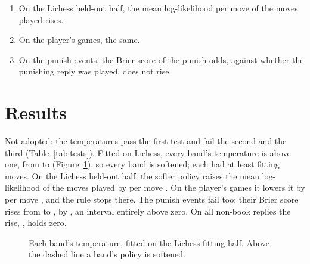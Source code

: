 \documentclass[11pt]{article}
\begin{document}
\begin{enumerate}[nosep]
\item On the Lichess held-out half, the mean log-likelihood per move of the moves played rises.
\item On the player's games, the same.
\item On the punish events, the Brier score of the punish odds, against whether the punishing
reply was played, does not rise.
\end{enumerate}

\section{Results}

Not adopted: the temperatures pass the first test and fail the second and the third
(Table~\ref{tab:tests}). Fitted on Lichess, every band's temperature is above one, from
\TempMin{} to \TempMax{} (Figure~\ref{fig:temps}), so every band is softened; each had at least
\FitMovesMin{} fitting moves. On the Lichess held-out half, the softer policy raises the mean
log-likelihood of the moves played by \TestOneDiff{} per move \TestOneCI. On the player's games
it lowers it by \TestTwoLoss{} per move \TestTwoLossCI, and the rule stops there. The punish
events fail too: their Brier score rises from \PunishRaw{} to \PunishTempered, by \TestThreeDiff{}
\TestThreeCI, an interval entirely above zero. On all non-book replies the rise,
\TestThreeAllDiff{} \TestThreeAllCI, holds zero.

\begin{table}[!htbp]
\centering\scriptsize
\setlength{\tabcolsep}{4pt}
\TestTable
\caption{The three tests, raw against tempered, with the 95\% interval of the difference over
\Draws{} bootstrap draws of games. A higher log-likelihood and a lower Brier score are better.
All non-book punish events are reported beside the verified ones and decide nothing.}
\label{tab:tests}
\end{table}

\begin{figure}[!htbp]
\centering
\TempFigure
\caption{Each band's temperature, fitted on the Lichess fitting half. Above the dashed line a
band's policy is softened.}
\label{fig:temps}
\end{figure}
\end{document}
